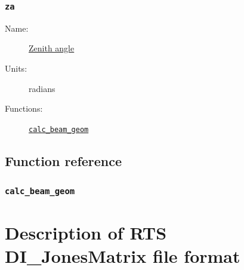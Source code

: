 \documentclass{book}
\begin{document}
\subsection{\texttt{za}}
\begin{description}
    \item[Name:] \hyperlink{sec:coordslocalsky}{Zenith angle}
    \item[Units:] radians
    \item[Functions:] \hyperlink{fcn:calc_beam_geom}{\texttt{calc\_beam\_geom}}
\end{description}

\section{Function reference}

\subsection{\texttt{calc\_beam\_geom}}
\label{fcn:calc_beam_geom}

\appendix

\chapter{Description of RTS DI\_JonesMatrix file format}
\end{document}

